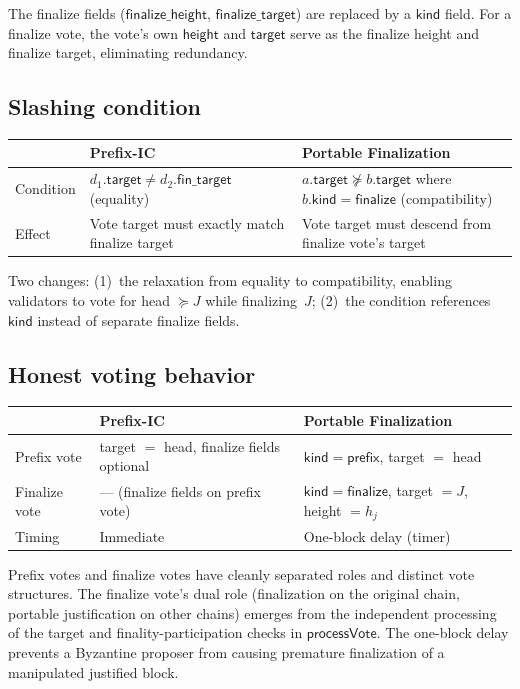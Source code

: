 \documentclass{article}
\newcommand{\target}{\mathsf{target}}
\newcommand{\kind}{\mathsf{kind}}
\newcommand{\height}{\mathsf{height}}
\newcommand{\finalize}{\mathsf{finalize}}
\newcommand{\prefix}{\mathsf{prefix}}
\newcommand{\fintarget}{\mathsf{fin\_target}}
\newcommand{\finalizetarget}{\mathsf{finalize\_target}}
\newcommand{\finalizeheight}{\mathsf{finalize\_height}}
\theoremstyle{plain}
\theoremstyle{definition}
\theoremstyle{remark}
\begin{document}
The finalize fields ($\finalizeheight$, $\finalizetarget$) are replaced by a $\kind$ field.
For a finalize vote, the vote's own $\height$ and $\target$ serve as the finalize height and finalize target, eliminating redundancy.

\subsection*{Slashing condition}

\begin{center}
\begin{tabularx}{\textwidth}{lXX}
\toprule
& \textbf{Prefix-IC} & \textbf{Portable Finalization} \\
\midrule
Condition & $d_1.\target \neq d_2.\fintarget$ (equality) & $a.\target \not\succeq b.\target$ where $b.\kind = \finalize$ (compatibility) \\
Effect & Vote target must exactly match finalize target & Vote target must descend from finalize vote's target \\
\bottomrule
\end{tabularx}
\end{center}

Two changes: (1)~the relaxation from equality to compatibility, enabling validators to vote for head $\succeq J$ while finalizing~$J$; (2)~the condition references $\kind$ instead of separate finalize fields.

\subsection*{Honest voting behavior}

\begin{center}
\begin{tabularx}{\textwidth}{lXX}
\toprule
& \textbf{Prefix-IC} & \textbf{Portable Finalization} \\
\midrule
Prefix vote & target $=$ head, finalize fields optional & $\kind = \prefix$, target $=$ head \\
Finalize vote & --- (finalize fields on prefix vote) & $\kind = \finalize$, target $= J$, height $= h_j$ \\
Timing & Immediate & One-block delay (timer) \\
\bottomrule
\end{tabularx}
\end{center}

Prefix votes and finalize votes have cleanly separated roles and distinct vote structures.
The finalize vote's dual role (finalization on the original chain, portable justification on other chains) emerges from the independent processing of the target and finality-participation checks in $\textsf{processVote}$.
The one-block delay prevents a Byzantine proposer from causing premature finalization of a manipulated justified block.
\end{document}
